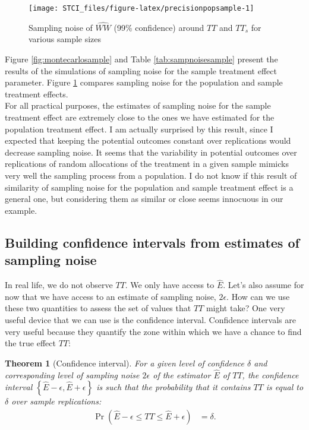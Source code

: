 \documentclass[
]{book}
\newtheorem{theorem}{Theorem}[chapter]
\theoremstyle{definition}
\theoremstyle{definition}
\theoremstyle{definition}
\theoremstyle{definition}
\theoremstyle{remark}
\begin{document}
\begin{figure}[htbp]

{\centering \texttt{[image: STCI\_files/figure-latex/precisionpopsample-1]} 

}

\caption{Sampling noise of $\hat{WW}$ (99\% confidence) around $TT$ and $TT_s$ for various sample sizes}\label{fig:precisionpopsample}
\end{figure}

Figure \ref{fig:montecarlosample} and Table \ref{tab:sampnoisesample} present the results of the simulations of sampling noise for the sample treatment effect parameter.
Figure \ref{fig:precisionpopsample} compares sampling noise for the population and sample treatment effects.\\
For all practical purposes, the estimates of sampling noise for the sample treatment effect are extremely close to the ones we have estimated for the population treatment effect.
I am actually surprised by this result, since I expected that keeping the potential outcomes constant over replications would decrease sampling noise.
It seems that the variability in potential outcomes over replications of random allocations of the treatment in a given sample mimicks very well the sampling process from a population.
I do not know if this result of similarity of sampling noise for the population and sample treatment effect is a general one, but considering them as similar or close seems innocuous in our example.

\hypertarget{sec:confinterv}{%
\subsection{Building confidence intervals from estimates of sampling noise}\label{sec:confinterv}}

In real life, we do not observe \(TT\).
We only have access to \(\hat{E}\).
Let's also assume for now that we have access to an estimate of sampling noise, \(2\epsilon\).
How can we use these two quantities to assess the set of values that \(TT\) might take?
One very useful device that we can use is the confidence interval.
Confidence intervals are very useful because they quantify the zone within which we have a chance to find the true effect \(TT\):

\begin{theorem}[Confidence interval]
\protect\hypertarget{thm:confinter}{}{\label{thm:confinter} \iffalse (Confidence interval) \fi{} }For a given level of confidence \(\delta\) and corresponding level of sampling noise \(2\epsilon\) of the estimator \(\hat{E}\) of \(TT\), the confidence interval \(\left\{\hat{E}-\epsilon,\hat{E}+\epsilon\right\}\) is such that the probability that it contains \(TT\) is equal to \(\delta\) over sample replications:
\begin{align*}
  \Pr(\hat{E}-\epsilon\leq TT\leq\hat{E}+\epsilon) & = \delta.
\end{align*}
\end{theorem}
\end{document}
